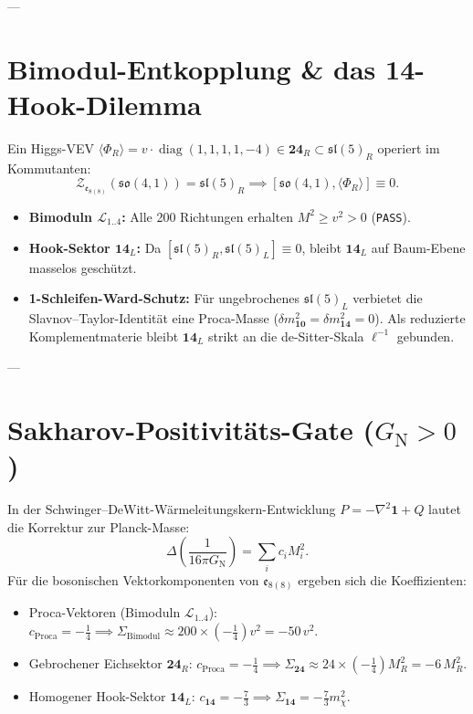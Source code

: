 \documentclass[11pt,a4paper]{article}
\begin{document}
---

\section{Bimodul-Entkopplung \& das 14-Hook-Dilemma}

Ein Higgs-VEV $\langle \Phi_R \rangle = v \cdot \operatorname{diag}(1,1,1,1,-4) \in \mathbf{24}_R \subset \mathfrak{sl}(5)_R$ operiert im Kommutanten:
\begin{equation}
\mathcal{Z}_{\mathfrak{e}_{8(8)}}(\mathfrak{so}(4,1)) = \mathfrak{sl}(5)_R \implies [\mathfrak{so}(4,1), \langle \Phi_R \rangle] \equiv 0.
\end{equation}
\begin{itemize}
    \item \textbf{Bimoduln $\mathcal{L}_{1..4}$:} Alle 200 Richtungen erhalten $M^2 \ge v^2 > 0$ (\texttt{PASS}).
    \item \textbf{Hook-Sektor $\mathbf{14}_L$:} Da $[\mathfrak{sl}(5)_R, \mathfrak{sl}(5)_L] \equiv 0$, bleibt $\mathbf{14}_L$ auf Baum-Ebene masselos geschützt.
    \item \textbf{1-Schleifen-Ward-Schutz:} Für ungebrochenes $\mathfrak{sl}(5)_L$ verbietet die Slavnov--Taylor-Identität eine Proca-Masse ($\delta m_{\mathbf{10}}^2 = \delta m_{\mathbf{14}}^2 = 0$). Als reduzierte Komplementmaterie bleibt $\mathbf{14}_L$ strikt an die de-Sitter-Skala $\ell^{-1}$ gebunden.
\end{itemize}

---

\section{Sakharov-Positivitäts-Gate ($G_{\mathrm{N}} > 0$)}

In der Schwinger--DeWitt-Wärmeleitungskern-Entwicklung $P = -\nabla^2\mathbf{1} + Q$ lautet die Korrektur zur Planck-Masse:
\begin{equation}
\Delta\left(\frac{1}{16\pi G_{\mathrm{N}}}\right) = \sum_i c_i M_i^2.
\end{equation}
Für die bosonischen Vektorkomponenten von $\mathfrak{e}_{8(8)}$ ergeben sich die Koeffizienten:
\begin{itemize}
    \item Proca-Vektoren (Bimoduln $\mathcal{L}_{1..4}$): $c_{\mathrm{Proca}} = -\frac{1}{4} \implies \Sigma_{\mathrm{Bimodul}} \approx 200 \times \left(-\frac{1}{4}\right) v^2 = -50\,v^2$.
    \item Gebrochener Eichsektor $\mathbf{24}_R$: $c_{\mathrm{Proca}} = -\frac{1}{4} \implies \Sigma_{\mathbf{24}} \approx 24 \times \left(-\frac{1}{4}\right) M_R^2 = -6\,M_R^2$.
    \item Homogener Hook-Sektor $\mathbf{14}_L$: $c_{\mathbf{14}} = -\frac{7}{3} \implies \Sigma_{\mathbf{14}} = -\frac{7}{3} m_\chi^2$.
\end{itemize}
\end{document}
